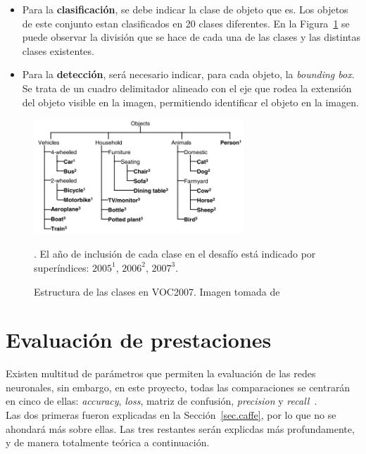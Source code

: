 \begin{itemize}
	\item Para la \textbf{clasificación}, se debe indicar la clase de objeto que es. Los objetos de este conjunto estan clasificados en 20 clases diferentes. En la Figura~\ref{fig.clasesVOC} se puede observar la división que se hace de cada una de las clases y las distintas clases existentes.
	\item Para la \textbf{detección}, será necesario indicar, para cada objeto, la \textit{bounding box}. Se trata de un cuadro delimitador alineado con el eje que rodea la extensión del objeto visible en la imagen, permitiendo identificar el objeto en la imagen.
\end{itemize}
\begin{figure}[H]
	\begin{center}
		\includegraphics[width=0.7\textwidth]{figures/vocclasses}
		\caption{Estructura de las clases en \ac{VOC}2007. Imagen tomada de~\cite{Everingham10}}. El año de inclusión de cada clase en el desafío está indicado por
		superíndices: $2005^1$, $2006^2$, $2007^3$.
		\label{fig.clasesVOC}
	\end{center}
\end{figure}

\section{Evaluación de prestaciones} \label{sec.prestaciones}
Existen multitud de parámetros que permiten la evaluación de las redes neuronales, sin embargo, en este proyecto, todas las comparaciones se centrarán en cinco de ellas: \textit{accuracy}, \textit{loss}, matriz de confusión, \textit{precision} y \textit{recall}~\cite{pullum2007guidance}.\\

Las dos primeras fueron explicadas en la Sección~\ref{sec.caffe}, por lo que no se ahondará más sobre ellas. Las tres restantes serán explicdas más profundamente, y de manera totalmente teórica a continuación.

